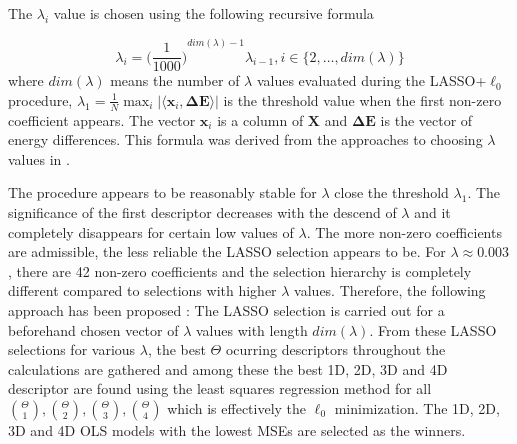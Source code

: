 \documentclass[11pt,oneside,czech,american]{book} %
\theoremstyle{definition} %
\theoremstyle{definition}
\renewcommand{\vec}[1]{\boldsymbol{#1}}
\begin{document}
The $\lambda_i$ value is chosen using the following recursive formula

\begin{equation}
	\lambda_i = {\Bigg(\frac{1}{1000}\Bigg)}^{dim(\lambda)-1} \lambda_{i-1}, i \in \{2, \dots, dim(\lambda)\}
\end{equation}
where $dim(\lambda)$ means the number of $\lambda$ values evaluated during the LASSO+$\ell_{0}$ procedure, $\lambda_1 = \frac{1}{N} \max_{i} | \langle \vec{x}_i , \vec{\Delta E} \rangle|$ is the threshold value when the first non-zero coefficient appears. The vector $\vec{x}_i$ is a column of $\vec{X}$ and $\vec{\Delta E}$ is the vector of energy differences. This formula was derived from the approaches to choosing $\lambda$ values in \parencite{ghiringhelli17}.

The procedure appears to be reasonably stable for $\lambda$ close the threshold $\lambda_1$. The significance of the first descriptor decreases with the descend of $\lambda$ and it completely disappears for certain low values of $\lambda$. The more non-zero coefficients are admissible, the less reliable the LASSO selection appears to be. For $\lambda \approx 0.003$, there are 42 non-zero coefficients and the selection hierarchy is completely different compared to selections with higher $\lambda$ values. Therefore, the following approach has been proposed \parencite{ghiringhelli15}: The LASSO selection is carried out for a beforehand chosen vector of $\lambda$ values with length $dim(\lambda)$. From these LASSO selections for various $\lambda$, the best $\Theta$ ocurring descriptors throughout the calculations are gathered and among
these the best 1D, 2D, 3D and 4D descriptor are found using the least squares regression method for all $\binom{\Theta}{1}, \binom{\Theta}{2}, \binom{\Theta}{3}, \binom{\Theta}{4}$ which is effectively the $\ell_{0}$ minimization. The 1D, 2D, 3D and 4D OLS models with the lowest MSEs are selected as the winners.


\end{document}
